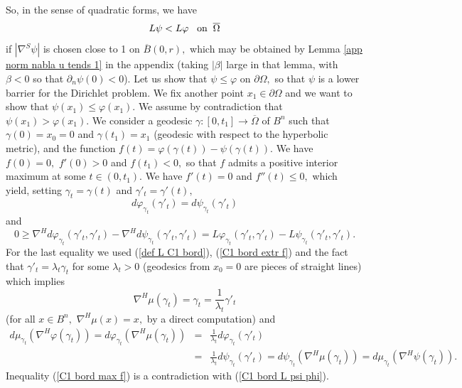\documentclass[10pt,reqno,oneside]{amsart}
\theoremstyle{definition}
\theoremstyle{remark}
\begin{document}
So, in the sense of quadratic forms, we have
\begin{equation}\label{C1 bord L psi phi}
L\psi< L\varphi\hspace{.3cm}\mbox{on}\hspace{.2cm}\overline{\Omega}
\end{equation}
if $|\nabla^S\psi|$ is chosen close to 1 on $\overline{B}(0,r),$ which may be obtained by Lemma \ref{app norm nabla u tends 1} in the appendix (taking $|\beta|$ large in that lemma, with $\beta<0$ so that $\partial_n\psi(0)<0$). Let us show that $\psi\leq\varphi$ on $\partial\Omega,$ so that $\psi$ is a lower barrier for the Dirichlet problem. We fix another point $x_1\in\partial\Omega$ and we want to show that $\psi(x_1)\leq\varphi(x_1).$ We assume by contradiction that $\psi(x_1)>\varphi(x_1)$. We consider a geodesic $\gamma:[0,t_1]\rightarrow\overline{\Omega}$ of $B^n$ such that $\gamma(0)=x_0=0$ and $\gamma(t_1)=x_1$ (geodesic with respect to the hyperbolic metric), and the function $f(t)=\varphi(\gamma(t))-\psi(\gamma(t)).$ We have $f(0)=0,$ $f'(0)>0$ and $f(t_1)<0,$ so that $f$ admits a positive interior maximum at some $t\in (0,t_1).$ We have $f'(t)=0$ and $f''(t)\leq 0,$ which yield, setting $\gamma_t=\gamma(t)$ and $\gamma'_t=\gamma'(t),$ 
\begin{equation}\label{C1 bord extr f}
d\varphi_{\gamma_t}(\gamma'_t)=d\psi_{\gamma_t}(\gamma'_t)
\end{equation}
and
\begin{equation}\label{C1 bord max f}
0\geq \nabla^H d\varphi_{\gamma_t}(\gamma'_t,\gamma'_t)- \nabla^H d\psi_{\gamma_t}(\gamma'_t,\gamma'_t)=L\varphi_{\gamma_t} (\gamma'_t,\gamma'_t)-L\psi_{\gamma_t} (\gamma'_t,\gamma'_t).
\end{equation}
For the last equality we used (\ref{def L C1 bord}), (\ref{C1 bord extr f}) and the fact that $\gamma'_t=\lambda_t\gamma_t$ for some $\lambda_t>0$ (geodesics from $x_0=0$ are pieces of straight lines) which implies
$$\nabla^H\mu(\gamma_t)=\gamma_t=\frac{1}{\lambda_t}\gamma'_t$$
(for all $x\in B^n,$ $\nabla^H\mu(x)=x,$ by a direct computation) and
\begin{eqnarray*}
d\mu_{\gamma_t}(\nabla^H\varphi(\gamma_t))=d\varphi_{\gamma_t}(\nabla^H\mu(\gamma_t))&=&\frac{1}{\lambda_t}d\varphi_{\gamma_t}(\gamma'_t)\\&=&\frac{1}{\lambda_t}d\psi_{\gamma_t}(\gamma'_t)=d\psi_{\gamma_t}(\nabla^H\mu(\gamma_t))=d\mu_{\gamma_t}(\nabla^H\psi(\gamma_t)).
\end{eqnarray*}
Inequality (\ref{C1 bord max f}) is a contradiction with (\ref{C1 bord L psi phi}).
\end{document}
